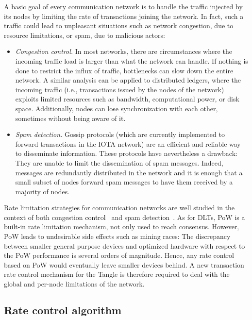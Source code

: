 \documentclass[../main.tex]{subfiles}
\begin{document}
A basic goal of every communication network is to handle the traffic injected by its nodes by limiting the rate of transactions joining the network. In fact, such a traffic could lead to unpleasant situations such as network congestion, due to resource limitations, or spam, due to malicious actors:

\begin{itemize}
    \item \textit{Congestion control.} In most networks, there are circumstances where the incoming traffic load is larger than what the network can handle. If nothing is done to restrict the influx of traffic, bottlenecks can slow down the entire network. A similar analysis can be applied to distributed ledgers, where the incoming traffic (i.e., transactions issued by the nodes of the network) exploits limited resources such as bandwidth, computational power, or disk space. Additionally, nodes can lose synchronization with each other, sometimes without being aware of it.
    \item \textit{Spam detection.} Gossip protocols (which are currently implemented to forward transactions in the IOTA network) are an efficient and reliable way to disseminate information. These protocols have nevertheless a drawback: They are unable to limit the dissemination of spam messages. Indeed, messages are redundantly distributed in the network and it is enough that a small subset of nodes forward spam messages to have them received by a majority of nodes.
\end{itemize}

Rate limitation strategies for communication networks are well studied in the context of both congestion control~\cite{kelly1998} and spam detection~\cite{dwork1993}. As for DLTs, PoW is a built-in rate limitation mechanism, not only used to reach consensus. However, PoW leads to undesirable side effects such as mining races: The discrepancy between smaller general purpose devices and optimized hardware with respect to the PoW performance is several orders of magnitude. Hence, any rate control based on PoW would eventually leave smaller devices behind. A new transaction rate control mechanism for the Tangle is therefore required to deal with the global and per-node limitations of the network.

\subsection{Rate control algorithm}
\end{document}
